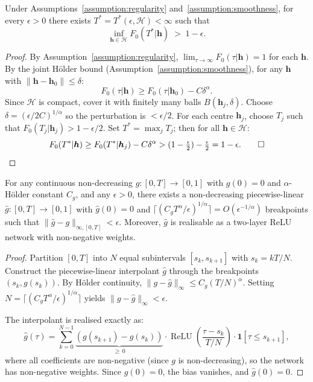 \begin{lemma}
\label{lem:tail}
Under Assumptions~\ref{assumption:regularity} and~\ref{assumption:smoothness},
for every $\epsilon > 0$ there exists $T^* = T^*(\epsilon, \mathcal{H}) < \infty$ such that
\[
\inf_{\boldsymbol{h} \in \mathcal{H}} F_0(T^*|\boldsymbol{h}) \;>\; 1 - \epsilon.
\]
\end{lemma}

\begin{proof}
By Assumption~\ref{assumption:regularity}, $\lim_{\tau\to\infty} F_0(\tau|\boldsymbol{h}) = 1$
for each $\boldsymbol{h}$.
By the joint H\"{o}lder bound (Assumption~\ref{assumption:smoothness}),
for any $\boldsymbol{h}$ with $\|\boldsymbol{h}-\boldsymbol{h}_0\| \leq \delta$:
\[
F_0(\tau|\boldsymbol{h}) \geq F_0(\tau|\boldsymbol{h}_0) - C\delta^\alpha.
\]
Since $\mathcal{H}$ is compact, cover it with finitely many balls $B(\boldsymbol{h}_j, \delta)$.
Choose $\delta = (\epsilon/2C)^{1/\alpha}$ so the perturbation is $< \epsilon/2$.
For each centre $\boldsymbol{h}_j$, choose $T_j$ such that
$F_0(T_j|\boldsymbol{h}_j) > 1 - \epsilon/2$.
Set $T^* = \max_j T_j$; then for all $\boldsymbol{h} \in \mathcal{H}$:
\[
F_0(T^*|\boldsymbol{h}) \geq F_0(T^*|\boldsymbol{h}_j) - C\delta^\alpha
> (1 - \tfrac{\epsilon}{2}) - \tfrac{\epsilon}{2} = 1 - \epsilon. \qed
\]
\end{proof}

\begin{lemma}
\label{lem:pwl}
For any continuous non-decreasing $g: [0,T] \to [0,1]$ with $g(0) = 0$
and $\alpha$-H\"{o}lder constant $C_g$,
and any $\epsilon > 0$, there exists a non-decreasing piecewise-linear
$\hat{g}: [0,T] \to [0,1]$ with $\hat{g}(0)=0$ and
$\lceil (C_g T^\alpha/\epsilon)^{1/\alpha} \rceil = O(\epsilon^{-1/\alpha})$ breakpoints such that
$\|\hat{g} - g\|_{\infty,[0,T]} < \epsilon$.
Moreover, $\hat{g}$ is realisable as a two-layer ReLU network with non-negative weights.
\end{lemma}

\begin{proof}
Partition $[0,T]$ into $N$ equal subintervals $[s_k, s_{k+1}]$ with $s_k = kT/N$.
Construct the piecewise-linear interpolant $\hat{g}$ through the breakpoints $(s_k, g(s_k))$.
By H\"{o}lder continuity, $\|g - \hat{g}\|_\infty \leq C_g (T/N)^\alpha$.
Setting $N = \lceil (C_g T^\alpha/\epsilon)^{1/\alpha} \rceil$ yields $\|g-\hat{g}\|_\infty < \epsilon$.

The interpolant is realised exactly as:
\[
\hat{g}(\tau) = \sum_{k=0}^{N-1} \underbrace{(g(s_{k+1})-g(s_k))}_{\geq\, 0}
\cdot \operatorname{ReLU}\!\left(\frac{\tau - s_k}{T/N}\right)
\cdot \mathbf{1}[\tau \leq s_{k+1}],
\]
where all coefficients are non-negative (since $g$ is non-decreasing), so the
network has non-negative weights. Since $g(0)=0$, the bias vanishes, and
$\hat{g}(0)=0$.
\end{proof}

